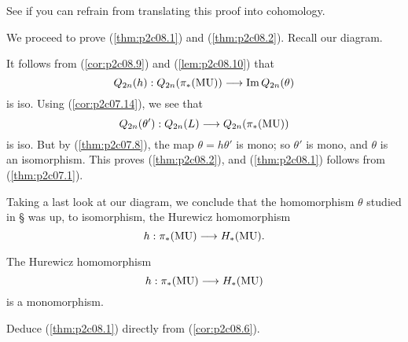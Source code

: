 \documentclass[../main]{subfiles}
\begin{document}
\begin{exercise}
See if you can refrain from translating this proof into cohomology. 
\end{exercise}

We proceed to prove (\ref{thm:p2c08.1}) and (\ref{thm:p2c08.2}). Recall our diagram.

\begin{center}
\end{center}
It follows from (\ref{cor:p2c08.9}) and (\ref{lem:p2c08.10}) that $$Q_{2n}(h) : Q_{2n}(\pi_\ast(\mathrm{MU})) \overset{}{\longrightarrow} \mathrm{Im} \, Q_{2n}(\theta)$$ is iso. Using (\ref{cor:p2c07.14}), we see that $$Q_{2n}(\theta') : Q_{2n}(L) \overset{}{\longrightarrow} Q_{2n}(\pi_\ast(\mathrm{MU}))$$ is iso. But by (\ref{thm:p2c07.8}), the map $\theta = h \theta'$ is mono; so $\theta'$ is mono, and $\theta$ is an isomorphism. This proves (\ref{thm:p2c08.2}), and (\ref{thm:p2c08.1}) follows from (\ref{thm:p2c07.1}). 

Taking a last look at our diagram, we conclude that the homomorphism $\theta$ studied in \S{} was up, to isomorphism, the Hurewicz homomorphism $$h : \pi_\ast(\mathrm{MU}) \overset{}{\longrightarrow} H_\ast(\mathrm{MU}).$$ 

\begin{corollary}
\label{cor:p2c08.11}
The Hurewicz homomorphism $$h : \pi_\ast(\mathrm{MU}) \overset{}{\longrightarrow} H_\ast(\mathrm{MU})$$ is a monomorphism. 
\end{corollary}

\begin{exercise}
Deduce (\ref{thm:p2c08.1}) directly from (\ref{cor:p2c08.6}).
\end{exercise}
\end{document}
